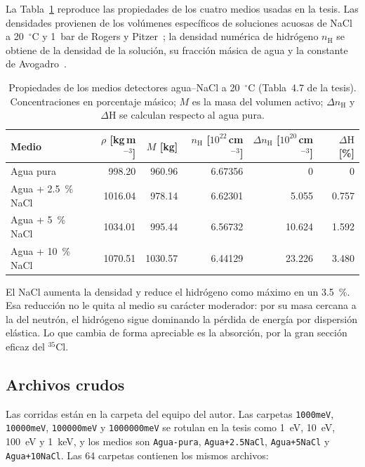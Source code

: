 \documentclass[11pt,a4paper]{article}
\newcommand{\codigo}[1]{\nolinkurl{#1}}
\newcommand{\archivo}[1]{\path{#1}}
\begin{document}
La Tabla~\ref{tab:medios} reproduce las propiedades de los cuatro medios usadas en la tesis. Las densidades provienen de los volúmenes específicos de soluciones acuosas de NaCl a 20~$^\circ$C y 1~bar de Rogers y Pitzer~\cite{Rogers1982}; la densidad numérica de hidrógeno $n_\mathrm{H}$ se obtiene de la densidad de la solución, su fracción másica de agua y la constante de Avogadro~\cite{Tiesinga2021}.

\begin{table}[H]
\centering
\small
\caption{Propiedades de los medios detectores agua--NaCl a 20~$^\circ$C (Tabla~4.7 de la tesis). Concentraciones en porcentaje másico; $M$ es la masa del volumen activo; $\Delta n_\mathrm{H}$ y $\Delta\mathrm{H}$ se calculan respecto al agua pura.}
\label{tab:medios}
\begin{tabular}{@{}lrrrrr@{}}
\toprule
\textbf{Medio} & $\rho$ [kg\,m$^{-3}$] & $M$ [kg] & $n_\mathrm{H}$ [$10^{22}$\,cm$^{-3}$] & $\Delta n_\mathrm{H}$ [$10^{20}$\,cm$^{-3}$] & $\Delta\mathrm{H}$ [\%] \\
\midrule
Agua pura & 998.20 & 960.96 & 6.67356 & 0 & 0 \\
Agua + 2.5~\% NaCl & 1016.04 & 978.14 & 6.62301 & 5.055 & 0.757 \\
Agua + 5~\% NaCl & 1034.01 & 995.44 & 6.56732 & 10.624 & 1.592 \\
Agua + 10~\% NaCl & 1070.51 & 1030.57 & 6.44129 & 23.226 & 3.480 \\
\bottomrule
\end{tabular}
\end{table}

El NaCl aumenta la densidad y reduce el hidrógeno como máximo en un 3.5~\%. Esa reducción no le quita al medio su carácter moderador: por su masa cercana a la del neutrón, el hidrógeno sigue dominando la pérdida de energía por dispersión elástica. Lo que cambia de forma apreciable es la absorción, por la gran sección eficaz del $^{35}$Cl.

\subsection{Archivos crudos}

Las corridas están en la carpeta \archivo{Neutrones-termicos/energia/medio/} del equipo del autor. Las carpetas \codigo{1000meV}, \codigo{10000meV}, \codigo{100000meV} y \codigo{1000000meV} se rotulan en la tesis como 1~eV, 10~eV, 100~eV y 1~keV, y los medios son \codigo{Agua-pura}, \codigo{Agua+2.5NaCl}, \codigo{Agua+5NaCl} y \codigo{Agua+10NaCl}. Las 64 carpetas contienen los mismos archivos:
\end{document}
